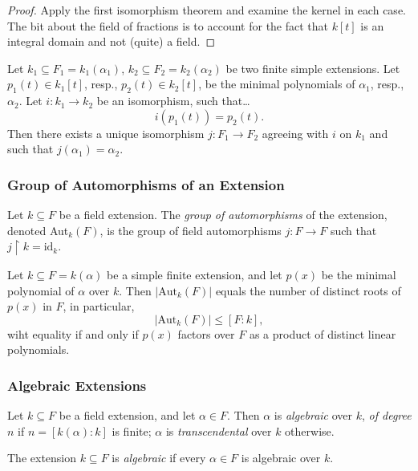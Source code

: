 \begin{proof}
Apply the first isomorphism theorem and examine the kernel in each case. The bit about the field of fractions
is to account for the fact that $k[t]$ is an integral domain and not (quite) a field.
\end{proof}

\begin{proposition}
Let $k_1 \subseteq F_1 = k_1(\alpha_1)$, $k_2 \subseteq F_2 = k_2(\alpha_2)$ be two finite simple
extensions. Let $p_1(t) \in k_1[t]$, resp., $p_2(t) \in k_2[t]$, be the minimal polynomials of $\alpha_1$,
resp., $\alpha_2$. Let $i : k_1 \rightarrow k_2$ be an isomorphism, such that\dots
$$i(p_1(t)) = p_2(t).$$
Then there exists a unique isomorphism $j : F_1 \rightarrow F_2$ agreeing with $i$ on $k_1$ and such that
$j(\alpha_1) = \alpha_2$.
\end{proposition}

\subsubsection{Group of Automorphisms of an Extension}\label{grpautomorphismext}

Let $k \subseteq F$ be a field extension. The \emph{group of automorphisms} of the extension,
denoted Aut$_k(F)$, is the group of field automorphisms $j : F \rightarrow F$ such that $j \upharpoonright k = \textrm{id}_k$.

\begin{corollary}
Let $k \subseteq F = k(\alpha)$ be a simple finite extension, and let $p(x)$ be the minimal polynomial of $\alpha$
over $k$. Then $|\textrm{Aut}_k(F)|$ equals the number of distinct roots of $p(x)$ in $F$, in particular,
$$|\textrm{Aut}_k(F)| \leq [F : k],$$
wiht equality if and only if $p(x)$ factors over $F$ as a product of distinct linear polynomials.
\end{corollary}

\subsubsection{Algebraic Extensions}\label{algebraicextension}
Let $k \subseteq F$ be a field extension, and let $\alpha \in F$. Then $\alpha$ is \emph{algebraic} over $k$,
\emph{of degree} $n$ if $n = [k(\alpha) : k]$ is finite; $\alpha$ is \emph{transcendental} over $k$ otherwise.\newline

\noindent The extension $k \subseteq F$ is \emph{algebraic} if every $\alpha \in F$ is algebraic over $k$.

